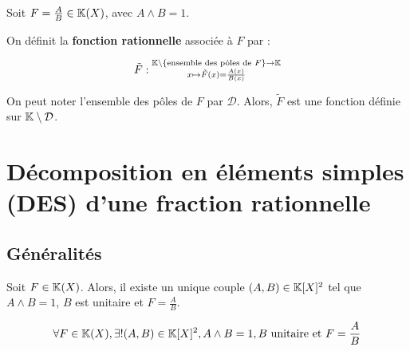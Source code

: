 \documentclass[12pt, a4paper]{report}
\begin{document}
\begin{definition}
    Soit $F = \frac AB \in \mathbb{K}(X)$, avec $A \wedge B = 1$.

    On définit la \textbf{fonction rationnelle} associée à $F$ par :

    $$\tilde F : \substack{\mathbb{K}\setminus\{\text{ensemble des pôles de } F\} \to \mathbb{K}\\ x \mapsto \tilde{F}(x) = \frac{A(x)}{B(x)}}$$
    
    On peut noter l'ensemble des pôles de $F$ par $\mathcal D$. Alors, $\tilde F$ est une fonction définie sur $\mathbb{K} \setminus \mathcal D$.
\end{definition}

\chapter{Décomposition en éléments simples (DES) d'une fraction rationnelle}

\section{Généralités}

\begin{theorem}
    Soit $F \in \mathbb{K}(X)$. Alors, il existe un unique couple $(A,B) \in \mathbb{K}[X]^2$ tel que $A \wedge B = 1$, $B$ est unitaire et $F = \frac AB$.

    $$\forall F \in \mathbb{K}(X), \exists! (A,B) \in \mathbb{K}[X]^2, A \wedge B = 1, B \text{ unitaire et } F = \frac AB$$
\end{theorem}
\end{document}
